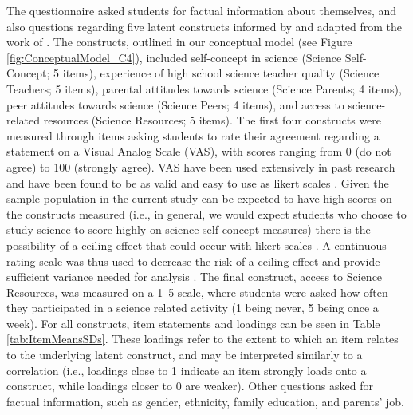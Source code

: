 The questionnaire asked students for factual information about themselves, and also questions regarding five latent constructs informed by and adapted from the work of \cite{dewitt2011high}. The constructs, outlined in our conceptual model (see Figure \ref{fig:ConceptualModel_C4}), included self-concept in science (Science Self-Concept; 5 items), experience of high school science teacher quality (Science Teachers; 5 items), parental attitudes towards science (Science Parents; 4 items), peer attitudes towards science (Science Peers; 4 items), and access to science-related resources (Science Resources; 5 items). The first four constructs were measured through items asking students to rate their agreement regarding a statement on a Visual Analog Scale (VAS), with scores ranging from 0 (do not agree) to 100 (strongly agree). VAS have been used extensively in past research and have been found to be as valid and easy to use as likert scales \citep{hasson2005validation}. Given the sample population in the current study can be expected to have high scores on the constructs measured (i.e., in general, we would expect students who choose to study science to score highly on science self-concept measures) there is the possibility of a ceiling effect that could occur with likert scales \citep{chyung2018evidence}. A continuous rating scale was thus used to decrease the risk of a ceiling effect and provide sufficient variance needed for analysis \citep{chyung2018evidence}. The final construct, access to Science Resources, was measured on a 1--5 scale, where students were asked how often they participated in a science related activity (1 being never, 5 being once a week). For all constructs, item statements and loadings can be seen in Table \ref{tab:ItemMeansSDs}. These loadings refer to the extent to which an item relates to the underlying latent construct, and may be interpreted similarly to a correlation (i.e., loadings close to 1 indicate an item strongly loads onto a construct, while loadings closer to 0 are weaker). Other questions asked for factual information, such as gender, ethnicity, family education, and parents' job. 
